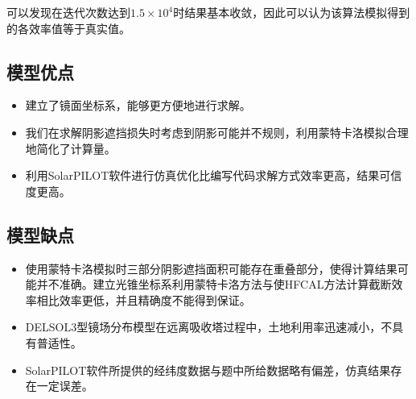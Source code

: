 \documentclass[withoutpreface,bwprint]{cumcmthesis} %
\begin{document}
可以发现在迭代次数达到$1.5\times 10^4$时结果基本收敛，因此可以认为该算法模拟得到的各效率值等于真实值。

\subsection{模型优点}
\begin{itemize}
	\item 建立了镜面坐标系，能够更方便地进行求解。
	\item 我们在求解阴影遮挡损失时考虑到阴影可能并不规则，利用蒙特卡洛模拟合理地简化了计算量。
	\item 利用SolarPILOT软件进行仿真优化比编写代码求解方式效率更高，结果可信度更高。
\end{itemize}
\subsection{模型缺点}
\begin{itemize}
	\item 使用蒙特卡洛模拟时三部分阴影遮挡面积可能存在重叠部分，使得计算结果可能并不准确。建立光锥坐标系利用蒙特卡洛方法与使HFCAL方法计算截断效率相比效率更低，并且精确度不能得到保证。
	\item DELSOL3型镜场分布模型在远离吸收塔过程中，土地利用率迅速减小，不具有普适性。
	\item SolarPILOT软件所提供的经纬度数据与题中所给数据略有偏差，仿真结果存在一定误差。
\end{itemize}










\clearpage


    
    
    
\end{document}
